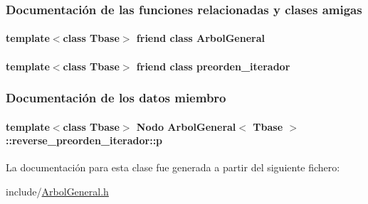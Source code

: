 \subsubsection{Documentación de las funciones relacionadas y clases amigas}
\hypertarget{classArbolGeneral_1_1reverse__preorden__iterador_a9c06e31b7c3e0d4ee5b03003d32935a5}{
\paragraph[{Arbol\-General}]{\setlength{\rightskip}{0pt plus 5cm}template$<$class Tbase$>$ friend class {\bf Arbol\-General}\hspace{0.3cm}{\ttfamily [friend]}}}\label{classArbolGeneral_1_1reverse__preorden__iterador_a9c06e31b7c3e0d4ee5b03003d32935a5}
\hypertarget{classArbolGeneral_1_1reverse__preorden__iterador_a4aa0da8bfbc320a8daff98451ee65b6c}{
\paragraph[{preorden\-\_\-iterador}]{\setlength{\rightskip}{0pt plus 5cm}template$<$class Tbase$>$ friend class {\bf preorden\-\_\-iterador}\hspace{0.3cm}{\ttfamily [friend]}}}\label{classArbolGeneral_1_1reverse__preorden__iterador_a4aa0da8bfbc320a8daff98451ee65b6c}


\subsubsection{Documentación de los datos miembro}
\hypertarget{classArbolGeneral_1_1reverse__preorden__iterador_a002862fdee453a84b037e5dd26c071a2}{
\paragraph[{p}]{\setlength{\rightskip}{0pt plus 5cm}template$<$class Tbase$>$ {\bf Nodo} {\bf Arbol\-General}$<$ Tbase $>$\-::reverse\-\_\-preorden\-\_\-iterador\-::p\hspace{0.3cm}{\ttfamily [private]}}}\label{classArbolGeneral_1_1reverse__preorden__iterador_a002862fdee453a84b037e5dd26c071a2}


La documentación para esta clase fue generada a partir del siguiente fichero\-:\begin{DoxyCompactItemize}
\item 
include/\hyperlink{ArbolGeneral_8h}{Arbol\-General.\-h}\end{DoxyCompactItemize}
